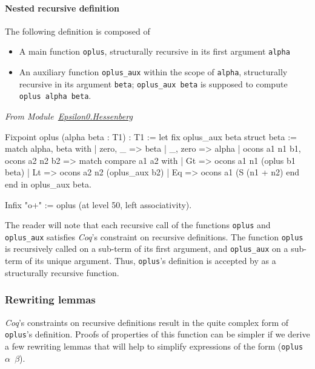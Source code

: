 \paragraph{Nested recursive definition}
\label{sec:orgheadline83}

The following definition is composed of 
\begin{itemize}
\item A main function \texttt{oplus}, structurally recursive in its 
first argument \texttt{alpha}
\item An auxiliary function \texttt{oplus\_aux} within the scope of \texttt{alpha},
structurally recursive in its argument \texttt{beta};  \texttt{oplus\_aux beta} 
   is supposed to compute  \texttt{oplus alpha beta}.
\end{itemize}
  
\vspace{4pt}
\emph{From Module~\href{../theories/html/hydras.Epsilon0.Hessenberg.html\#oplus}{Epsilon0.Hessenberg}}

\label{sect:infix-oplus}

\begin{Coqsrc}
Fixpoint oplus (alpha beta : T1) : T1 :=
  let fix oplus_aux beta {struct beta} :=
      match alpha, beta with
        | zero, _ => beta
        | _,  zero => alpha
        | ocons a1 n1 b1, ocons a2 n2 b2 =>
          match compare a1 a2 with
            |  Gt => ocons a1 n1 (oplus b1 beta)
            |  Lt => ocons a2 n2 (oplus_aux b2)
            |  Eq => ocons a1 (S (n1 + n2)%
          end
      end
  in oplus_aux beta.

Infix "o+" := oplus  (at level 50, left associativity).
\end{Coqsrc}


The reader will note that each recursive call of the functions
\texttt{oplus} and \texttt{oplus\_aux} satisfies \emph{Coq}'s constraint
on recursive definitions. The function \texttt{oplus} is recursively called on a sub-term of its first argument,
and \texttt{oplus\_aux} on a sub-term of its unique argument.
Thus, \texttt{oplus}'s definition is accepted by \coq{} as a structurally recursive function.

\subsubsection{Rewriting lemmas}
\label{sec:orgheadline86}

\emph{Coq}'s constraints on recursive definitions result in 
the quite  complex form of \texttt{oplus}'s definition.
Proofs of properties of this function can be simpler if we
 derive a few  rewriting lemmas that will help to simplify 
expressions of the form (\texttt{oplus $\alpha$ $\beta$}).

